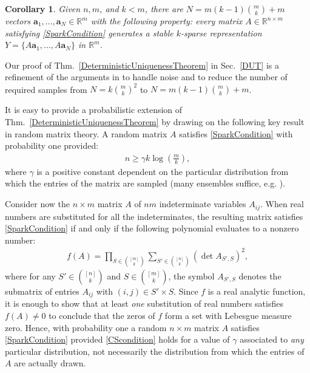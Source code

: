 \documentclass[journal, twocolumn]{IEEEtran}
\newtheorem{corollary}{Corollary}
\begin{document}
\begin{corollary}\label{DeterministicUniquenessCorollary}
Given $n, m$, and $k < m$, there are $N =  m(k-1){m \choose k}+m$ vectors \mbox{$\mathbf{a}_1, \ldots, \mathbf{a}_N \in \mathbb{R}^m$} with the following property: every matrix $A \in \mathbb{R}^{n \times m}$ satisfying \eqref{SparkCondition} generates a stable $k$-sparse representation $Y = \{A\mathbf{a}_1, \ldots, A\mathbf{a}_N\}$ in $\mathbb R^m$.
\end{corollary}

Our proof of Thm.~\ref{DeterministicUniquenessTheorem} in Sec.~\ref{DUT} is a refinement of the arguments in \cite{Hillar15} to handle noise and to reduce the number of required samples from $N=k{m \choose k}^2$ to $N = m(k-1){m \choose k}+m$. 




It is easy to provide a probabilistic extension of Thm.~\ref{DeterministicUniquenessTheorem} by drawing on the following key result in random matrix theory. A random matrix $A$ satisfies \eqref{SparkCondition} with probability one 
provided:
\begin{align}\label{CScondition}
n \geq \gamma k\log\left(\frac{m}{k}\right),
\end{align}
where $\gamma$ is a positive constant dependent on the particular distribution from which the entries of the matrix are sampled (many ensembles suffice, e.g. \cite[Sec.~4]{Baraniuk08}). 

Consider now the $n \times m$ matrix $A$ of $nm$ indeterminate variables $A_{ij}$. When real numbers are substituted for all the indeterminates, the resulting matrix satisfies \eqref{SparkCondition} if and only if the following polynomial evaluates to a nonzero number:
\begin{align*}
f(A) = \prod_{S \in {[m] \choose k}} \sum_{S' \in {[n] \choose k}} (\det A_{S',S})^2,
\end{align*}
%
where for any $S' \in {[n] \choose k}$ and $S \in {[m] \choose k}$, the symbol $A_{S',S}$ denotes the submatrix of entries $A_{ij}$ with $(i,j) \in S' \times S$. Since $f$ is a real analytic function, it is enough to show that at least \emph{one} substitution of real numbers satisfies $f(A) \neq 0$ to conclude that the zeros of $f$ form a set with Lebesgue measure zero. Hence, with probability one a random $n \times m$ matrix $A$ satisfies \eqref{SparkCondition} provided \eqref{CScondition} holds for a value of $\gamma$ associated to \emph{any} particular distribution, not necessarily the distribution from which the entries of $A$ are actually drawn. 
 
\end{document}
